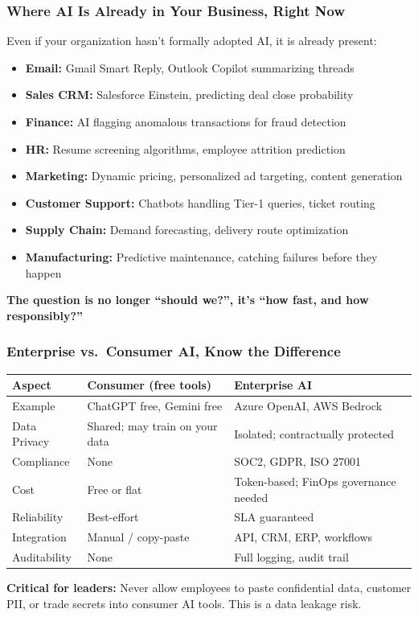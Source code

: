 \begin{frame}[fragile]\frametitle{Where AI Is Already in Your Business, Right Now}

Even if your organization hasn't formally adopted AI, it is already present:
\begin{itemize}
  \item \textbf{Email:} Gmail Smart Reply, Outlook Copilot summarizing threads
  \item \textbf{Sales CRM:} Salesforce Einstein, predicting deal close probability
  \item \textbf{Finance:} AI flagging anomalous transactions for fraud detection
  \item \textbf{HR:} Resume screening algorithms, employee attrition prediction
  \item \textbf{Marketing:} Dynamic pricing, personalized ad targeting, content generation
  \item \textbf{Customer Support:} Chatbots handling Tier-1 queries, ticket routing
  \item \textbf{Supply Chain:} Demand forecasting, delivery route optimization
  \item \textbf{Manufacturing:} Predictive maintenance, catching failures before they happen
\end{itemize}

\textbf{The question is no longer ``should we?'', it's ``how fast, and how responsibly?''}

\end{frame}

\begin{frame}[fragile]\frametitle{Enterprise vs.\ Consumer AI, Know the Difference}

\begin{center}
\begin{tabular}{|p{1.5cm}|p{2cm}|p{3cm}|}
\hline
\textbf{Aspect} & \textbf{Consumer (free tools)} & \textbf{Enterprise AI} \\
\hline
Example & ChatGPT free, Gemini free & Azure OpenAI, AWS Bedrock \\
Data Privacy & Shared; may train on your data & Isolated; contractually protected \\
Compliance & None & SOC2, GDPR, ISO 27001 \\
Cost & Free or flat & Token-based; FinOps governance needed \\
Reliability & Best-effort & SLA guaranteed \\
Integration & Manual / copy-paste & API, CRM, ERP, workflows \\
Auditability & None & Full logging, audit trail \\
\hline
\end{tabular}
\end{center}

\vspace{0.3em}
\textbf{Critical for leaders:} Never allow employees to paste confidential data, customer PII, or trade secrets into consumer AI tools. This is a data leakage risk.

\end{frame}

